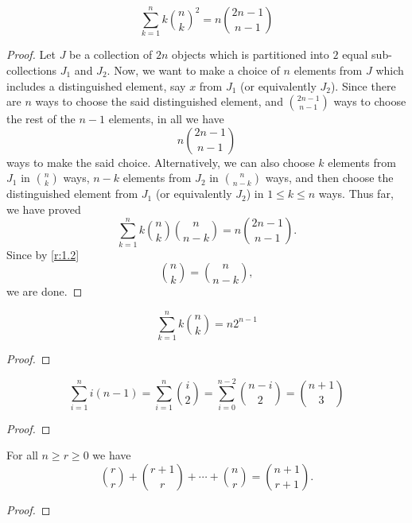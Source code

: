 \begin{comment}
Next we prove the Chu-Vandermonde identity.
\begin{question}
	\binom{2n}{n} = \sum_{k=0}^{n} \binom{n}{k}^2
\end{question}

\begin{question}
	For all $n>0$. \[
		\sum_{k=0}^{n} 2^k\binom{n}{k} = 3^n
	\]
\end{question}

\begin{question}
	For $n>0$  \[
		2\binom{2n-1}{n} = \binom{2n}{n}
	.\] 
\end{question}
Give two proofs. One using Pascals identity. The other by choosing sets.
\end{comment}

\begin{claim}
\[
\sum_{k=1}^{n}k\binom{n}{k}^2 = n\binom{2n-1}{n-1}
\]
\end{claim}
\begin{proof}
Let $J$ be a collection of $2n$ objects which is partitioned into $2$ equal sub-collections $J_1$ and $J_2$. Now, we want to make a choice of $n$ elements from $J$ which includes a distinguished element, say $x$ from $J_1$ (or equivalently $J_2$). Since there are $n$ ways to choose the said distinguished element, and $\binom{2n-1}{n-1}$ ways to choose the rest of the $n-1$ elements, in all we have \[
n\binom{2n-1}{n-1}
\] ways to make the said choice. Alternatively, we can also choose $k$ elements from $J_1$ in $\binom{n}{k}$ ways, $n-k$ elements from $J_2$ in $\binom{n}{n-k}$ ways, and then choose the distinguished element from $J_1$ (or equivalently $J_2$) in $1\leq k\leq n$ ways. Thus far, we have proved
\[
\sum_{k=1}^{n}k\binom{n}{k}\binom{n}{n-k} = n\binom{2n-1}{n-1}.
\]
Since by \cref{r:1.2} \[
\binom{n}{k} = \binom{n}{n-k},
\]
we are done. 
\end{proof}
\begin{claim}
\[
\sum_{k=1}^{n}k\binom{n}{k} = n2^{n-1}
\]
\end{claim}
\begin{proof}
\end{proof}

\begin{claim}
\[
\sum_{i=1}^{n}i(n-1) = \sum_{i=1}^{n}\binom{i}{2} = \sum_{i=0}^{n-2}\binom{n-i}{2} = \binom{n+1}{3} 
\]
\end{claim}
\begin{proof}
\end{proof}

\begin{claim}
For all $n\geq r\geq 0$ we have 
\[
		 \binom{r}{r}+\binom{r+1}{r}+\cdots+\binom{n}{r} = \binom{n+1}{r+1}
.\] 
\end{claim}
\begin{proof}
\end{proof}

